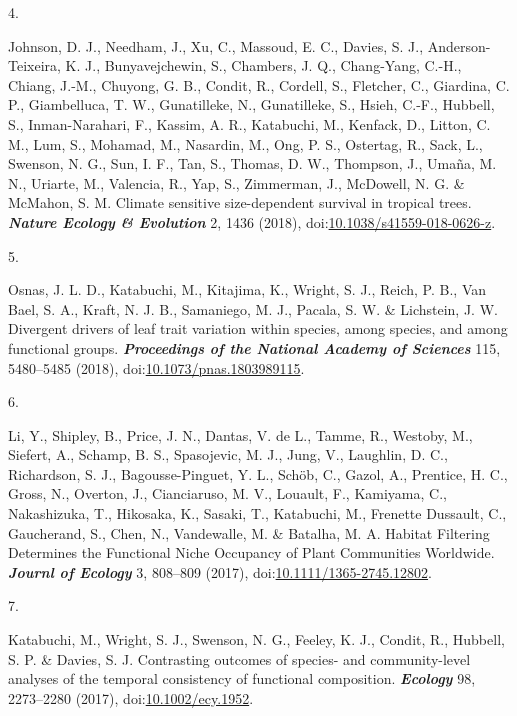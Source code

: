 \documentclass[
]{article}
\newlength{\cslhangindent}
\newlength{\csllabelwidth}
\newlength{\cslentryspacingunit} %
\newenvironment{CSLReferences}[2] %
 {%
  \setlength{\parindent}{0pt}
  \ifodd #1
  \let\oldpar\par
  \def\par{\hangindent=\cslhangindent\oldpar}
  \fi
  \setlength{\parskip}{#2\cslentryspacingunit}
 }%
 {}
\newcommand{\CSLLeftMargin}[1]{\parbox[t]{\csllabelwidth}{#1}}
\newcommand{\CSLRightInline}[1]{\parbox[t]{\linewidth - \csllabelwidth}{#1}\break}
\begin{document}
\begin{CSLReferences}{0}{0}
\leavevmode{}%
\CSLLeftMargin{4. }
\CSLRightInline{Johnson, D. J., Needham, J., Xu, C., Massoud, E. C.,
Davies, S. J., Anderson-Teixeira, K. J., Bunyavejchewin, S., Chambers,
J. Q., Chang-Yang, C.-H., Chiang, J.-M., Chuyong, G. B., Condit, R.,
Cordell, S., Fletcher, C., Giardina, C. P., Giambelluca, T. W.,
Gunatilleke, N., Gunatilleke, S., Hsieh, C.-F., Hubbell, S.,
Inman-Narahari, F., Kassim, A. R., Katabuchi, M., Kenfack, D., Litton,
C. M., Lum, S., Mohamad, M., Nasardin, M., Ong, P. S., Ostertag, R.,
Sack, L., Swenson, N. G., Sun, I. F., Tan, S., Thomas, D. W., Thompson,
J., Umaña, M. N., Uriarte, M., Valencia, R., Yap, S., Zimmerman, J.,
McDowell, N. G. \& McMahon, S. M. {Climate sensitive size-dependent
survival in tropical trees}. \textbf{\emph{Nature Ecology {\&}
Evolution}} 2, 1436 (2018),
doi:\href{https://doi.org/10.1038/s41559-018-0626-z}{10.1038/s41559-018-0626-z}.}

\leavevmode{}%
\CSLLeftMargin{5. }
\CSLRightInline{Osnas, J. L. D., Katabuchi, M., Kitajima, K., Wright, S.
J., Reich, P. B., Van Bael, S. A., Kraft, N. J. B., Samaniego, M. J.,
Pacala, S. W. \& Lichstein, J. W. Divergent drivers of leaf trait
variation within species, among species, and among functional groups.
\textbf{\emph{Proceedings of the National Academy of Sciences}} 115,
5480--5485 (2018),
doi:\href{https://doi.org/10.1073/pnas.1803989115}{10.1073/pnas.1803989115}.}

\leavevmode{}%
\CSLLeftMargin{6. }
\CSLRightInline{Li, Y., Shipley, B., Price, J. N., Dantas, V. de L.,
Tamme, R., Westoby, M., Siefert, A., Schamp, B. S., Spasojevic, M. J.,
Jung, V., Laughlin, D. C., Richardson, S. J., Bagousse-Pinguet, Y. L.,
Schöb, C., Gazol, A., Prentice, H. C., Gross, N., Overton, J.,
Cianciaruso, M. V., Louault, F., Kamiyama, C., Nakashizuka, T.,
Hikosaka, K., Sasaki, T., Katabuchi, M., Frenette Dussault, C.,
Gaucherand, S., Chen, N., Vandewalle, M. \& Batalha, M. A. {Habitat
Filtering Determines the Functional Niche Occupancy of Plant Communities
Worldwide}. \textbf{\emph{Journl of Ecology}} 3, 808--809 (2017),
doi:\href{https://doi.org/10.1111/1365-2745.12802}{10.1111/1365-2745.12802}.}

\leavevmode{}%
\CSLLeftMargin{7. }
\CSLRightInline{Katabuchi, M., Wright, S. J., Swenson, N. G., Feeley, K.
J., Condit, R., Hubbell, S. P. \& Davies, S. J. Contrasting outcomes of
species- and community-level analyses of the temporal consistency of
functional composition. \textbf{\emph{Ecology}} 98, 2273--2280 (2017),
doi:\href{https://doi.org/10.1002/ecy.1952}{10.1002/ecy.1952}.}


\end{CSLReferences}
\end{document}
